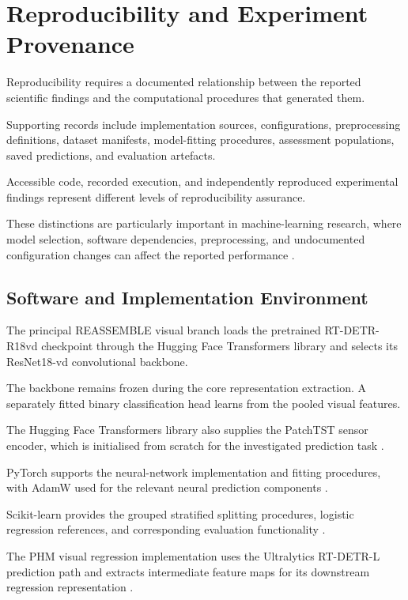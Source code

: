 \section{Reproducibility and Experiment Provenance}
\label{sec:ch4-reproducibility}

Reproducibility requires a documented relationship between the reported scientific findings and the computational procedures that generated them.

Supporting records include implementation sources, configurations, preprocessing definitions, dataset manifests, model-fitting procedures, assessment populations, saved predictions, and evaluation artefacts.

Accessible code, recorded execution, and independently reproduced experimental findings represent different levels of reproducibility assurance.

These distinctions are particularly important in machine-learning research, where model selection, software dependencies, preprocessing, and undocumented configuration changes can affect the reported performance \parencite{P009}.

\subsection{Software and Implementation Environment}

The principal REASSEMBLE visual branch loads the pretrained RT-DETR-R18vd checkpoint through the Hugging Face Transformers library and selects its ResNet18-vd convolutional backbone.

The backbone remains frozen during the core representation extraction. A separately fitted binary classification head learns from the pooled visual features.

The Hugging Face Transformers library also supplies the PatchTST sensor encoder, which is initialised from scratch for the investigated prediction task \parencite{Wolf2020Transformers}.

PyTorch supports the neural-network implementation and fitting procedures, with AdamW used for the relevant neural prediction components \parencite{Paszke2019PyTorch}.

Scikit-learn provides the grouped stratified splitting procedures, logistic regression references, and corresponding evaluation functionality \parencite{Pedregosa2011ScikitLearn}.

The PHM visual regression implementation uses the Ultralytics RT-DETR-L prediction path and extracts intermediate feature maps for its downstream regression representation \parencite{UltralyticsRTDETR}.


